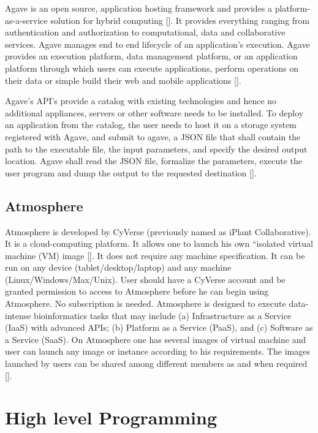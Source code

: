 Agave is an open source, application hosting framework and provides a
platform-as-a-service solution for hybrid
computing [\cite{agave-paper}]. It provides everything ranging from
authentication and authorization to computational, data and
collaborative services. Agave manages end to end lifecycle of an
application's execution.  Agave provides an execution platform, data
management platform, or an application platform through which users
can execute applications, perform operations on their data or simple
build their web and mobile applications [\cite{www-agaveapi-features}].

Agave's API's provide a catalog with existing technologies and hence
no additional appliances, servers or other software needs to be
installed. To deploy an application from the catalog, the user needs
to host it on a storage system registered with Agave, and submit to
agave, a JSON file that shall contain the path to the executable file,
the input parameters, and specify the desired output location. Agave
shall read the JSON file, formalize the parameters, execute the user
program and dump the output to the requested
destination [\cite{agave-paper}].

\subsection{Atmosphere}

Atmosphere is developed by CyVerse (previously named as iPlant
Collaborative).  It is a cloud-computing platform. It allows one to
launch his own ``isolated virtual machine (VM) image [\cite{www-at1}].
It does not require any machine specification. It can be run on any
device (tablet/desktop/laptop) and any machine
(Linux/Windows/Max/Unix).  User should have a CyVerse account and be
granted permission to access to Atmosphere before he can begin using
Atmosphere. No subscription is needed.  Atmosphere is designed to
execute data-intense bioinformatics tasks that may include
(a) Infrastructure as a Service (IaaS) with advanced APIs; (b) Platform as
a Service (PaaS), and (c) Software as a Service (SaaS).  On Atmosphere
one has several images of virtual machine and user can launch any
image or instance according to his requirements.  The images launched
by users can be shared among different members as and when
required [\cite{www-at2}].

\section{High level Programming}

